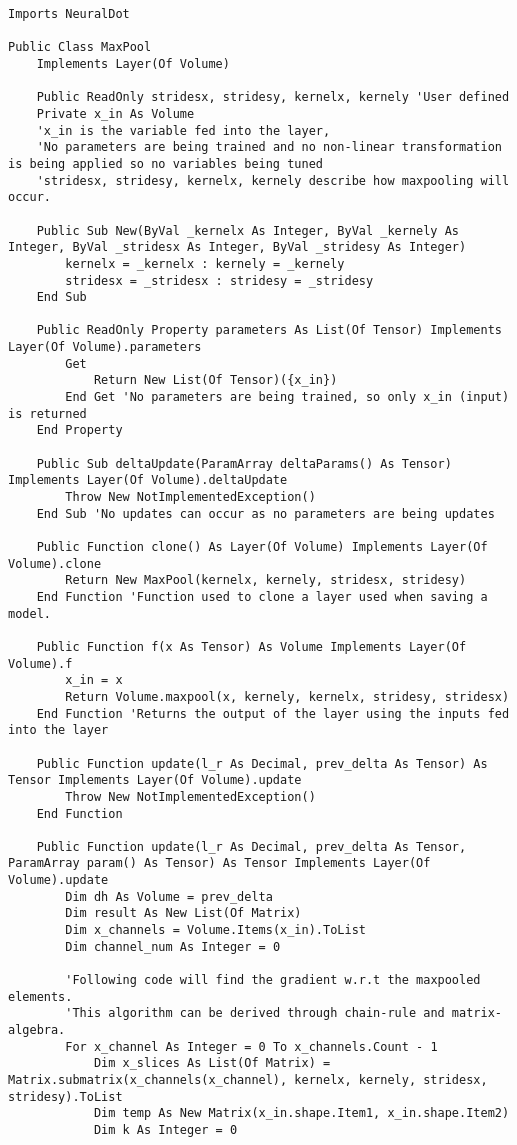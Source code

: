 \begin{verbatim}
Imports NeuralDot

Public Class MaxPool
    Implements Layer(Of Volume)

    Public ReadOnly stridesx, stridesy, kernelx, kernely 'User defined
    Private x_in As Volume
    'x_in is the variable fed into the layer, 
    'No parameters are being trained and no non-linear transformation is being applied so no variables being tuned
    'stridesx, stridesy, kernelx, kernely describe how maxpooling will occur.

    Public Sub New(ByVal _kernelx As Integer, ByVal _kernely As Integer, ByVal _stridesx As Integer, ByVal _stridesy As Integer)
        kernelx = _kernelx : kernely = _kernely
        stridesx = _stridesx : stridesy = _stridesy
    End Sub

    Public ReadOnly Property parameters As List(Of Tensor) Implements Layer(Of Volume).parameters
        Get
            Return New List(Of Tensor)({x_in})
        End Get 'No parameters are being trained, so only x_in (input) is returned 
    End Property

    Public Sub deltaUpdate(ParamArray deltaParams() As Tensor) Implements Layer(Of Volume).deltaUpdate
        Throw New NotImplementedException()
    End Sub 'No updates can occur as no parameters are being updates

    Public Function clone() As Layer(Of Volume) Implements Layer(Of Volume).clone
        Return New MaxPool(kernelx, kernely, stridesx, stridesy)
    End Function 'Function used to clone a layer used when saving a model.

    Public Function f(x As Tensor) As Volume Implements Layer(Of Volume).f
        x_in = x
        Return Volume.maxpool(x, kernely, kernelx, stridesy, stridesx)
    End Function 'Returns the output of the layer using the inputs fed into the layer

    Public Function update(l_r As Decimal, prev_delta As Tensor) As Tensor Implements Layer(Of Volume).update
        Throw New NotImplementedException()
    End Function

    Public Function update(l_r As Decimal, prev_delta As Tensor, ParamArray param() As Tensor) As Tensor Implements Layer(Of Volume).update
        Dim dh As Volume = prev_delta
        Dim result As New List(Of Matrix)
        Dim x_channels = Volume.Items(x_in).ToList
        Dim channel_num As Integer = 0

        'Following code will find the gradient w.r.t the maxpooled elements.
        'This algorithm can be derived through chain-rule and matrix-algebra.
        For x_channel As Integer = 0 To x_channels.Count - 1
            Dim x_slices As List(Of Matrix) = Matrix.submatrix(x_channels(x_channel), kernelx, kernely, stridesx, stridesy).ToList
            Dim temp As New Matrix(x_in.shape.Item1, x_in.shape.Item2)
            Dim k As Integer = 0


\end{verbatim}
